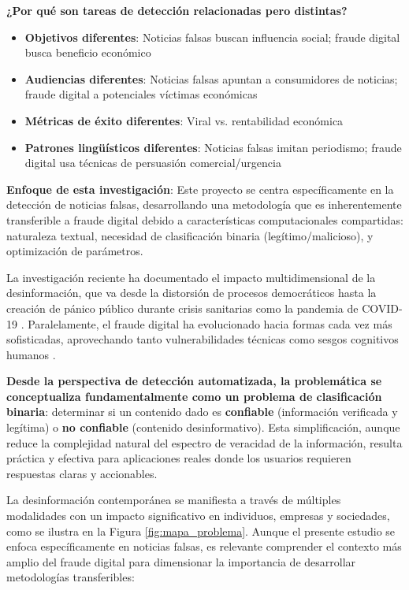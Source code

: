\textbf{¿Por qué son tareas de detección relacionadas pero distintas?}
\begin{itemize}
    \item \textbf{Objetivos diferentes}: Noticias falsas buscan influencia social; fraude digital busca beneficio económico
    \item \textbf{Audiencias diferentes}: Noticias falsas apuntan a consumidores de noticias; fraude digital a potenciales víctimas económicas
    \item \textbf{Métricas de éxito diferentes}: Viral vs. rentabilidad económica
    \item \textbf{Patrones lingüísticos diferentes}: Noticias falsas imitan periodismo; fraude digital usa técnicas de persuasión comercial/urgencia
\end{itemize}

\textbf{Enfoque de esta investigación}: Este proyecto se centra específicamente en la detección de noticias falsas, desarrollando una metodología que es inherentemente transferible a fraude digital debido a características computacionales compartidas: naturaleza textual, necesidad de clasificación binaria (legítimo/malicioso), y optimización de parámetros.

La investigación reciente ha documentado el impacto multidimensional de la desinformación, que va desde la distorsión de procesos democráticos \cite{ali2020posttruth} hasta la creación de pánico público durante crisis sanitarias como la pandemia de COVID-19 \cite{perez2020fake}. Paralelamente, el fraude digital ha evolucionado hacia formas cada vez más sofisticadas, aprovechando tanto vulnerabilidades técnicas como sesgos cognitivos humanos \cite{ali2021fake}.

\textbf{Desde la perspectiva de detección automatizada, la problemática se conceptualiza fundamentalmente como un problema de clasificación binaria}: determinar si un contenido dado es \textbf{confiable} (información verificada y legítima) o \textbf{no confiable} (contenido desinformativo). Esta simplificación, aunque reduce la complejidad natural del espectro de veracidad de la información, resulta práctica y efectiva para aplicaciones reales donde los usuarios requieren respuestas claras y accionables.

La desinformación contemporánea se manifiesta a través de múltiples modalidades con un impacto significativo en individuos, empresas y sociedades, como se ilustra en la Figura \ref{fig:mapa_problema}. Aunque el presente estudio se enfoca específicamente en noticias falsas, es relevante comprender el contexto más amplio del fraude digital para dimensionar la importancia de desarrollar metodologías transferibles:

